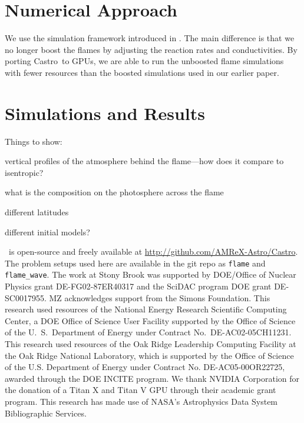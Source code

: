 \documentclass[preprint,times,tighten]{aastex63}
\newcommand{\castro}{{\sf Castro}}
\begin{document}
\section{Numerical Approach}\label{Sec:numerics}

We use the simulation framework introduced in \citet{flame_wave1}.
The main difference is that we no longer boost the flames by adjusting
the reaction rates and conductivities.  By porting \castro\ to GPUs,
we are able to run the unboosted flame simulations with fewer
resources than the boosted simulations used in our earlier paper.

\section{Simulations and Results}\label{Sec:results}

Things to show:

vertical profiles of the atmosphere behind the flame---how does it compare to isentropic?

what is the composition on the photosphere across the flame

different latitudes

different initial models?


\acknowledgements \castro\ is open-source and freely available at
\url{http://github.com/AMReX-Astro/Castro}.  The problem setups used
here are available in the git repo as {\tt flame} and {\tt
  flame\_wave}.  The work at Stony Brook was supported by DOE/Office
of Nuclear Physics grant DE-FG02-87ER40317 and the SciDAC program DOE
grant DE-SC0017955.  MZ acknowledges support from the Simons
Foundation.  This research used resources of the National Energy
Research Scientific Computing Center, a DOE Office of Science User
Facility supported by the Office of Science of the U.~S.\ Department
of Energy under Contract No.\ DE-AC02-05CH11231.  This research used
resources of the Oak Ridge Leadership Computing Facility at the Oak
Ridge National Laboratory, which is supported by the Office of Science
of the U.S. Department of Energy under Contract No. DE-AC05-00OR22725,
awarded through the DOE INCITE program.  We thank NVIDIA Corporation
for the donation of a Titan X and Titan V GPU through their academic
grant program.  This research has made use of NASA's Astrophysics Data
System Bibliographic Services.
\end{document}

